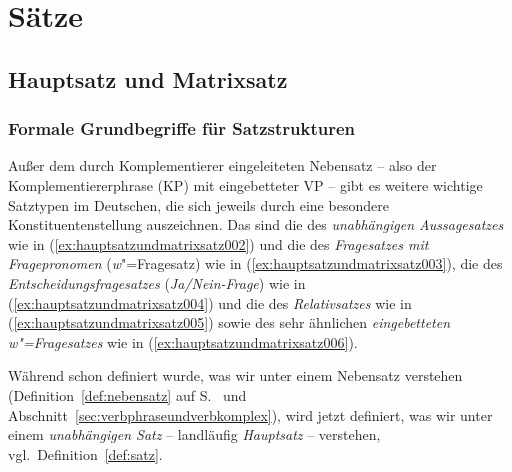 \chapter{Sätze}
\label{sec:saetze}

\section{Hauptsatz und Matrixsatz}
\label{sec:hauptsatzundmatrixsatz}

\subsection{Formale Grundbegriffe für Satzstrukturen}
\label{sec:formalegrundbegriffefuersatzstrukturen}

Außer dem durch Komplementierer eingeleiteten Nebensatz -- also der Komplementiererphrase (KP) mit eingebetteter VP -- gibt es weitere wichtige Satztypen im Deutschen, die sich jeweils durch eine besondere Konstituentenstellung auszeichnen.
Das sind die des \textit{unabhängigen Aussagesatzes} wie in (\ref{ex:hauptsatzundmatrixsatz002}) und die des \textit{Fragesatzes mit Fragepronomen} (\textit{w}"=Fragesatz) wie in (\ref{ex:hauptsatzundmatrixsatz003}), die des \textit{Entscheidungsfragesatzes} (\textit{Ja\slash Nein-Frage}) wie in (\ref{ex:hauptsatzundmatrixsatz004}) und die des \textit{Relativsatzes} wie in (\ref{ex:hauptsatzundmatrixsatz005}) sowie des sehr ähnlichen \textit{eingebetteten \textit{w}"=Fragesatzes} wie in (\ref{ex:hauptsatzundmatrixsatz006}).

\begin{exe}
  \ex\label{ex:hauptsatzundmatrixsatz001}
  \begin{xlist}
  \end{xlist}
\end{exe}

Während schon definiert wurde, was wir unter einem Nebensatz verstehen (Definition~\ref{def:nebensatz} auf S.~\pageref{def:nebensatz} und Abschnitt~\ref{sec:verbphraseundverbkomplex}), wird jetzt definiert, was wir unter einem \textit{unabhängigen Satz} -- landläufig \textit{Hauptsatz} -- verstehen, vgl.\ Definition~\ref{def:satz}.

